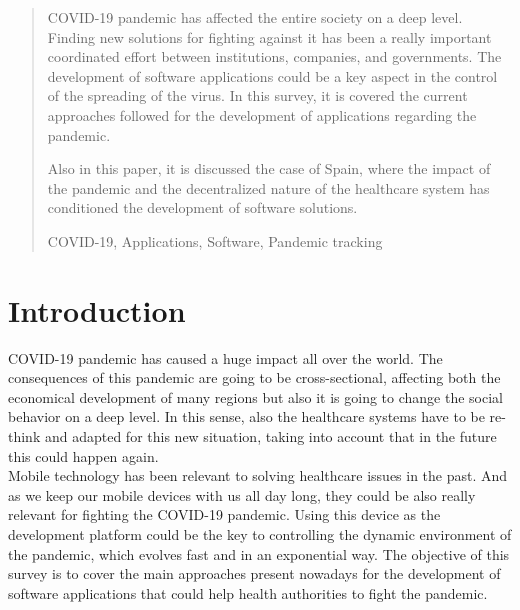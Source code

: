 \documentclass[a4paper, 12pt]{article}
\newenvironment{keywords}
{\begin{list}{}{\setlength{\leftmargin}{1em}}\item[\hskip\labelsep \bfseries Keywords:]}
{\end{list}}
\begin{document}


\newpage
\begin{abstract}
{\em

COVID-19 pandemic has affected the entire society on a deep level. Finding new solutions for fighting against it has been a really important coordinated effort between institutions, companies, and governments. The development of software applications could be a key aspect in the control of the spreading of the virus. In this survey, it is covered the current approaches followed for the development of applications regarding the pandemic. 

\bigskip

Also in this paper, it is discussed the case of Spain, where the impact of the pandemic and the decentralized nature of the healthcare system has conditioned the development of software solutions.
}

\begin{keywords}
COVID-19, Applications, Software, Pandemic tracking
\end{keywords}
\end{abstract}

\newpage{\pagestyle{empty}}
\thispagestyle{empty}


\tableofcontents
\newpage{\pagestyle{empty}}


\setcounter{page}{1}

\section{Introduction}
\label{section:introduction}

COVID-19 pandemic has caused a huge impact all over the world. The consequences of this pandemic are going to be cross-sectional, affecting both the economical development of many regions but also it is going to change the social behavior on a deep level. In this sense, also the healthcare systems have to be re-think and adapted for this new situation, taking into account that in the future this could happen again. \\

Mobile technology has been relevant to solving healthcare issues in the past. And as we keep our mobile devices with us all day long, they could be also really relevant for fighting the COVID-19 pandemic. Using this device as the development platform could be the key to controlling the dynamic environment of the pandemic, which evolves fast and in an exponential way. The objective of this survey is to cover the main approaches present nowadays for the development of software applications that could help health authorities to fight the pandemic. \\
\end{document}
